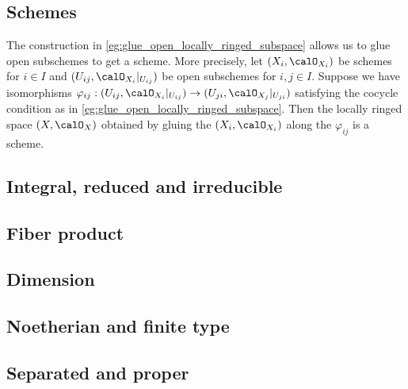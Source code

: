 \subsection{Schemes}

    \begin{example}\label{eg:glue_open_subschemes}
        The construction in \cref{eg:glue_open_locally_ringed_subspace} allows us to glue open subschemes to get a scheme.
        More precisely, let \((X_i, \calO_{X_i})\) be schemes for \(i \in I\) and \((U_{ij}, \calO_{X_i}|_{U_{ij}})\) be open subschemes for \(i,j \in I\).
        Suppose we have isomorphisms \(\varphi_{ij} : (U_{ij}, \calO_{X_i}|_{U_{ij}}) \to (U_{ji}, \calO_{X_j}|_{U_{ji}})\) satisfying the cocycle condition as in \cref{eg:glue_open_locally_ringed_subspace}.
        Then the locally ringed space \((X, \calO_X)\) obtained by gluing the \((X_i, \calO_{X_i})\) along the \(\varphi_{ij}\) is a scheme.
    \end{example}

\subsection{Integral, reduced and irreducible}

\subsection{Fiber product}

\subsection{Dimension}

\subsection{Noetherian and finite type}

\subsection{Separated and proper}

